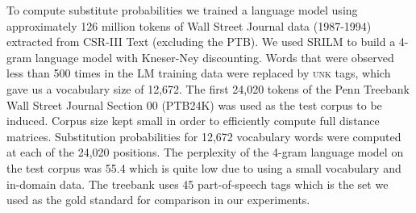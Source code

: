 
To compute substitute probabilities we trained a language model using
approximately 126 million tokens of Wall Street Journal data
(1987-1994) extracted from CSR-III Text \cite{csr3text} (excluding the
PTB).
We used SRILM \cite{Stolcke2002} to build a 4-gram language model with
Kneser-Ney discounting.
Words that were observed less than 500 times in the LM training data
were replaced by \textsc{unk} tags, which gave us a vocabulary size of
12,672.
The first 24,020 tokens of the Penn Treebank Wall Street Journal
Section 00 (PTB24K) was used as the test corpus to be induced.  Corpus
size kept small in order to efficiently compute full distance
matrices.  Substitution probabilities for 12,672 vocabulary words were
computed at each of the 24,020 positions.
The perplexity of the 4-gram language model on the test corpus was
55.4 which is quite low due to using a small 
vocabulary and in-domain data.
The treebank uses 45 part-of-speech tags which is the set we used as
the gold standard for comparison in our experiments.

